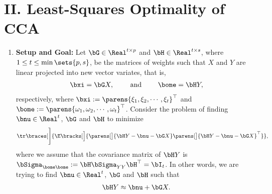 \documentclass[12pt]{article}
\begin{document}
\section*{II. Least-Squares Optimality of CCA}


\begin{enumerate}[label=\textbf{\arabic*.}]

	\item \textbf{Setup and Goal:} Let $\bG \in \Real^{t \times p}$ and $\bH \in \Real^{t \times s}$, where $1 \le t \le \min \sets{p, s}$, be the matrices of weights such that $X$ and $Y$ are linear projected into new vector variates, that is, 
	\begin{align}
		\bxi = \bG X, \qquad \text{ and } \qquad \bome = \bH Y, 
	\end{align}
	respectively, where $\bxi := \parens{\xi_1, \xi_2, \cdots, \xi_t}^\top$ and $\bome := \parens{\omega_1, \omega_2, \cdots, \omega_t}^\top$. Consider the problem of finding $\bnu \in \Real^{t}$, $\bG$ and $\bH$ to minimize 
	\begin{align}\label{ls.cca}
		\tr \braces[\Bigg]{\E \bracks[\Big]{\parens[\big]{\bH Y - \bnu - \bG X} \parens[\big]{\bH Y - \bnu - \bG X}^\top}}, 
	\end{align}
	where we assume that the covariance matrix of $\bH Y$ is $\bSigma_{\bome \bome} := \bH \bSigma_{YY} \bH^\top = \bI_t$. In other words, we are trying to find $\bnu \in \Real^{t}$, $\bG$ and $\bH$ such that 
	\begin{align*}
		\bH Y \approx \bnu + \bG X. 
	\end{align*}
	

\end{enumerate}
\end{document}
